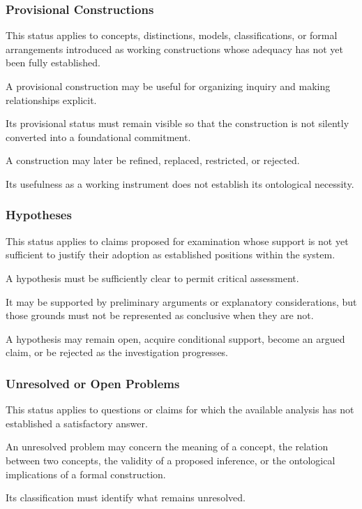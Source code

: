 \subsubsection{Provisional Constructions}

This status applies
to concepts, distinctions,
models, classifications,
or formal arrangements
introduced as
working constructions
whose adequacy
has not yet
been fully established.

A provisional
construction may
be useful for
organizing inquiry
and making
relationships
explicit.

Its provisional
status must
remain visible
so that the
construction is
not silently
converted into
a foundational
commitment.

A construction
may later be
refined, replaced,
restricted, or
rejected.

Its usefulness
as a working
instrument does
not establish
its ontological
necessity.

\subsubsection{Hypotheses}

This status applies
to claims proposed
for examination
whose support
is not yet
sufficient to
justify their
adoption as
established positions
within the system.

A hypothesis
must be sufficiently
clear to permit
critical assessment.

It may be
supported by
preliminary arguments
or explanatory
considerations,
but those grounds
must not be
represented as
conclusive when
they are not.

A hypothesis
may remain
open, acquire
conditional support,
become an argued
claim, or be
rejected as
the investigation
progresses.

\subsubsection{Unresolved or Open Problems}

This status applies
to questions or
claims for which
the available
analysis has
not established
a satisfactory
answer.

An unresolved
problem may
concern the
meaning of
a concept,
the relation
between two
concepts,
the validity
of a proposed
inference,
or the ontological
implications of
a formal construction.

Its classification
must identify
what remains
unresolved.

